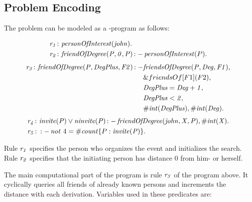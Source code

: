 \documentclass[a4paper, titlepage]{article}
\newcommand{\ext}[3]{\ensuremath{\&{#1}[#2](#3)}}
\DeclareMathOperator{\leftimpl}{:-}
\newcommand{\row}[1]{%
  \ensuremath{\it \color{black} #1 \color{black}}%
}
\begin{document}
\subsection{Problem Encoding}
The problem can be modeled as a \hex{}-program as follows:
\begin{exmp}
\label{faceQuery}
\begin{align*}
\row{\row{r_1}}\colon & \mathit{personOfInterest}(\mathit{john}). \\
\row{r_2}\colon & \mathit{friendOfDegree}(\mathit{P, 0, P}) 
\leftimpl  \mathit{personOfInterest}(P).\\
\end{align*}
\begin{align*}
\row{r_3}\colon \mathit{friendOfDegree}(\mathit{P, DegPlus, 
F2}) \leftimpl 
& \mathit{friendsOfDegree}(\mathit{P,Deg,F1)},\\
& \ext{friendsOf}{F1}{F2},\\ 
& \mathit{DegPlus = Deg + 1}, \\
& \mathit{DegPlus < 2},\\
& \mathit{\#int(DegPlus)}, \mathit{\#int(Deg)}.\\
\end{align*}
\begin{align*}
\row{r_4}\colon & \mathit{invite(P)} \vee \mathit{ninvite(P) 
\leftimpl  friendOfDegree(john,X,P), \#int(X).}\\
\row{r_5}\colon & \leftimpl   \mathit{not} \ 4 = \mathit{\#count} 
\{ P : \mathit{invite(P)} \}. \\
\end{align*}
\end{exmp}
Rule $\row{\row{r_1}}$ specifies the person who organizes the event 
and initializes the search. Rule $\row{r_2}$ specifies that the initiating person has 
distance 0 from him- or herself. 


The main computational part of the program is rule $\row{r_3}$ of 
the program above. It cyclically queries all  friends of 
already known persons and increments the distance with each 
derivation. Variables used in these predicates are: 
\end{document}
